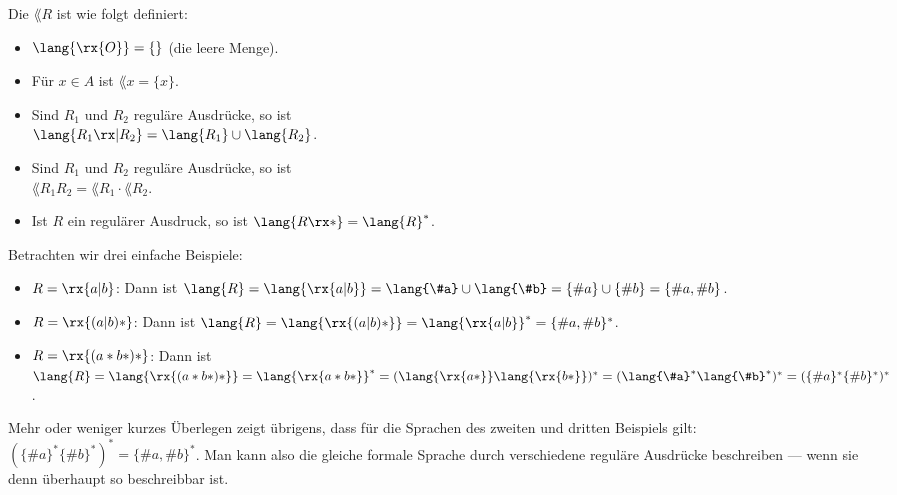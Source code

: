 Die 
$\lang{R}$ ist wie folgt definiert:
% 
\begin{itemize}
\item $\lang{\rx{O}} = \{\}$ (\dh die leere Menge).
\item Für $x\in A$ ist $\lang{x}=\{x\}$.
\item Sind $R_1$ und $R_2$ reguläre Ausdrücke, so ist \\
  $\lang{R_1 \rx| R_2} = \lang{R_1} \cup \lang{R_2}$.
\item Sind $R_1$ und $R_2$ reguläre Ausdrücke, so ist \\
  $\lang{R_1 R_2} = \lang{R_1} \cdot \lang{R_2}$.
\item Ist $R$ ein regulärer Ausdruck, so ist $\lang{R\rx*} =
  \lang{R}^*$.
\end{itemize}
%
Betrachten wir drei einfache Beispiele:
\begin{itemize}
\item $R = \rx{a|b}$: Dann ist $\lang{R} = \lang{\rx{a|b}} =
  \lang{\#a}\cup\lang{\#b} = \{\#a\}\cup\{\#b\} = \{\#a,\#b\}$.
\item $R = \rx{(a|b)*}$: Dann ist $\lang{R} = \lang{\rx{(a|b)*}}  
  = \lang{\rx{a|b}}^* = \{\#a,\#b\}^*$.
\item $R = \rx{(a*b*)*}$: Dann ist $\lang{R} = \lang{\rx{(a*b*)*}}
  = \lang{\rx{a*b*}}^* = (\lang{\rx{a*}}\lang{\rx{b*}})^* 
  = (\lang{\#a}^*\lang{\#b}^*)^* = (\{\#a\}^*\{\#b\}^*)^*$. 
\end{itemize}
%
Mehr oder weniger kurzes Überlegen zeigt übrigens, dass für die
Sprachen des zweiten und dritten Beispiels gilt:
$(\{\#a\}^*\{\#b\}^*)^* = \{\#a,\#b\}^*$.  Man kann also die gleiche
formale Sprache durch verschiedene reguläre Ausdrücke beschreiben ---
wenn sie denn überhaupt so beschreibbar ist.

